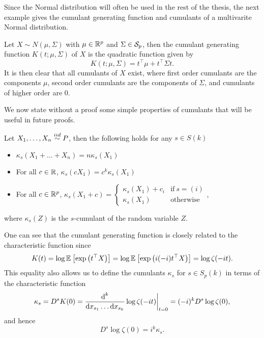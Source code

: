 Since the Normal distribution will often be used in the rest of the thesis, the next example gives the cumulant  generating function and cumulants of a multivarite Normal distribution.
\begin{example} \label{ex-cumulants-mvn}
    Let $X \sim N(\mu, \Sigma)$ with $\mu \in {\mathbb{R}^p}$ and $\Sigma \in {\mathcal{S}_p}$, then the cumulant generating function $K(t; \mu, \Sigma)$ of $X$ is the quadratic function given by
    \begin{equation*}
        K(t; \mu, \Sigma) = t^\top\mu + t^\top\Sigma t.
    \end{equation*}
    It is then clear that all cumulants of $X$ exist, where first order cumulants are the components $\mu$, second order cumulants are the components of $\Sigma$, and cumulants of higher order are 0.
\end{example}

We now state without a proof some simple properties of cumulants that will be useful in future proofs.
\begin{lemma} \label{lem-cumulants-props}
    Let $X_1, \ldots, X_n \stackrel{iid}{\sim} P$, then the following holds for any $s \in S(k)$
    \begin{itemize}
        \item {
        $\kappa_s(X_1 + \ldots + X_n) = n\kappa_s(X_1)$
        }
        \item {
            For all $c \in \mathbb{R}$, $\kappa_s(c X_1) = c^k\kappa_s(X_1)$
        }
        \item {
            For all $c \in {\mathbb{R}^p}$, $\kappa_s(X_1 + c) =
            \begin{cases}
                \kappa_s(X_1) + c_i &\text{if}\ s=(i)\\
                \kappa_s(X_1)& \text{otherwise}
            \end{cases}$,
        }
    \end{itemize}
    where $\kappa_s(Z)$ is the $s$-cumulant of the random variable $Z$.
\end{lemma}

One can see that the cumulant generating function is closely related to the characteristic function since
\begin{equation*}
    K(t) 
    = \log \mathbb{E}_{}\left[\exp\left(t^\top X\right)\right] 
    = \log \mathbb{E}_{}\left[\exp\left(i (-i)t^\top X\right)\right]
    = \log \zeta(-it).
\end{equation*}
This equality also allows us to define the cumulants $\kappa_s$ for $s \in S_p(k)$ in terms of the characteristic function
\begin{equation*}
    \kappa_s = D^s K(0) 
    = \frac{\text{d}^k}{\text{d} x_{s_1} \ldots \text{d} x_{s_k}} \log \zeta(-it) \bigg|_{t=0}
    = (-i)^{k} D^s \log \zeta(0),
\end{equation*}
and hence
\begin{equation*}
    D^s \log \zeta(0) = i^k \kappa_s.
\end{equation*}